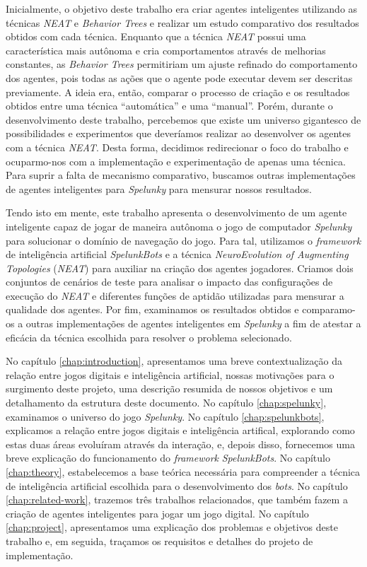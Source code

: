 Inicialmente, o objetivo deste trabalho era criar agentes inteligentes
utilizando as técnicas \textit{NEAT} e \textit{Behavior Trees} e realizar um
estudo comparativo dos resultados obtidos com cada técnica. Enquanto que a
técnica \textit{NEAT} possui uma característica mais autônoma e cria
comportamentos através de melhorias constantes, as \textit{Behavior Trees}
permitiriam um ajuste refinado do comportamento dos agentes, pois todas as ações
que o agente pode executar devem ser descritas previamente. A ideia era, então,
comparar o processo de criação e os resultados obtidos entre uma técnica
``automática'' e uma ``manual''. Porém, durante o desenvolvimento deste
trabalho, percebemos que existe um universo gigantesco de possibilidades e
experimentos que deveríamos realizar ao desenvolver os agentes com a técnica
\textit{NEAT}. Desta forma, decidimos redirecionar o foco do trabalho e
ocuparmo-nos com a implementação e experimentação de apenas uma técnica. Para
suprir a falta de mecanismo comparativo, buscamos outras implementações de
agentes inteligentes para \textit{Spelunky} para mensurar nossos resultados.

Tendo isto em mente, este trabalho apresenta o desenvolvimento de um agente
inteligente capaz de jogar de maneira autônoma o jogo de computador
\textit{Spelunky} para solucionar o domínio de navegação do jogo. Para tal,
utilizamos o \textit{framework} de inteligência artificial \textit{SpelunkBots}
e a técnica \textit{NeuroEvolution of Augmenting Topologies} (\textit{NEAT})
para auxiliar na criação dos agentes jogadores. Criamos dois conjuntos de
cenários de teste para analisar o impacto das configurações de execução do
\textit{NEAT} e diferentes funções de aptidão utilizadas para mensurar a
qualidade dos agentes. Por fim, examinamos os resultados obtidos e comparamo-os
a outras implementações de agentes inteligentes em \textit{Spelunky} a fim de
atestar a eficácia da técnica escolhida para resolver o problema selecionado.

No capítulo \ref{chap:introduction}, apresentamos uma breve contextualização da
relação entre jogos digitais e inteligência artificial, nossas motivações para
o surgimento deste projeto, uma descrição resumida de nossos objetivos e um
detalhamento da estrutura deste documento. No capítulo \ref{chap:spelunky},
examinamos o universo do jogo \textit{Spelunky}. No capítulo
\ref{chap:spelunkbots}, explicamos a relação entre jogos digitais e
inteligência artifical, explorando como estas duas áreas evoluíram através da
interação, e, depois disso, fornecemos uma breve explicação do funcionamento do
\textit{framework} \textit{SpelunkBots}. No capítulo \ref{chap:theory},
estabelecemos a base teórica necessária para compreender a técnica de
inteligência artificial escolhida para o desenvolvimento dos \textit{bots}. No
capítulo \ref{chap:related-work}, trazemos três trabalhos relacionados, que
também fazem a criação de agentes inteligentes para jogar um jogo digital.  No
capítulo \ref{chap:project}, apresentamos uma explicação dos problemas e
objetivos deste trabalho e, em seguida, traçamos os requisitos e detalhes do
projeto de implementação.

